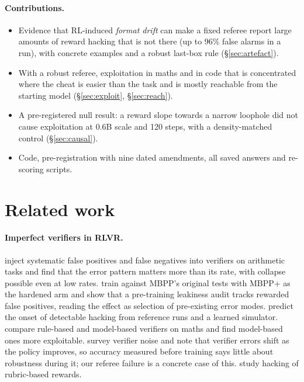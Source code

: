 \documentclass[11pt]{article}
\begin{document}
\paragraph{Contributions.}
\begin{itemize}
\item Evidence that RL-induced \emph{format drift} can make a fixed referee report large amounts of reward hacking that is not there (up to 96\% false alarms in a run), with concrete examples and a robust last-box rule (\S\ref{sec:artefact}).
\item With a robust referee, exploitation in maths and in code that is concentrated where the cheat is easier than the task and is mostly reachable from the starting model (\S\ref{sec:exploit}, \S\ref{sec:reach}).
\item A pre-registered null result: a reward slope towards a narrow loophole did not cause exploitation at 0.6B scale and 120 steps, with a density-matched control (\S\ref{sec:causal}).
\item Code, pre-registration with nine dated amendments, all saved answers and re-scoring scripts.
\end{itemize}

\section{Related work}
\paragraph{Imperfect verifiers in RLVR.} \citet{egashira2026} inject systematic false positives and false negatives into verifiers on arithmetic tasks and find that the error pattern matters more than its rate, with collapse possible even at low rates. \citet{zhang2026leaky} train against MBPP's original tests with MBPP+ \citep{evalplus} as the hardened arm and show that a pre-training leakiness audit tracks rewarded false positives, reading the effect as selection of pre-existing error modes. \citet{deng2026simhack} predict the onset of detectable hacking from reference runs and a learned simulator. \citet{huang2025verifiers} compare rule-based and model-based verifiers on maths and find model-based ones more exploitable. \citet{gupta2026checking} survey verifier noise and note that verifier errors shift as the policy improves, so accuracy measured before training says little about robustness during it; our referee failure is a concrete case of this. \citet{wang2026rubric} study hacking of rubric-based rewards.
\end{document}
